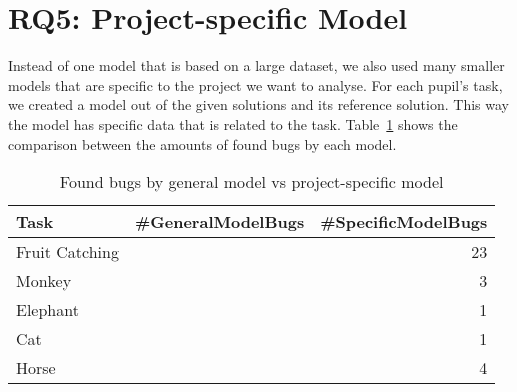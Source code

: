 \section{RQ5: Project-specific Model}\label{sec:project-specific}
Instead of one model that is based on a large dataset, we also used many smaller models that are specific to the project we want to analyse. For each pupil's task, we created a model out of the given solutions and its reference solution. This way the model has specific data that is related to the task. Table~\ref{tab:amountbugs} shows the comparison between the amounts of found bugs by each model.

\begin{table}[H]
    \centering
    \caption[Found bugs by general model vs project-specific model]{\label{tab:amountbugs}Found bugs by general model vs project-specific model}
    \begin{tabular}{lrr}
        \toprule
        Task & \#GeneralModelBugs & \#SpecificModelBugs \\
        \midrule
        Fruit Catching  & & 23  \\
        Monkey  & & 3\\
        Elephant  & & 1  \\
        Cat  & & 1 \\
        Horse & & 4 \\
        \bottomrule
    \end{tabular}
\end{table}
